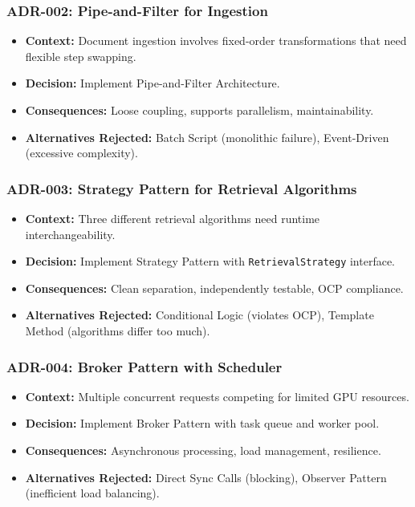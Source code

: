 \documentclass[11pt,a4paper]{article}
\begin{document}
\subsubsection{ADR-002: Pipe-and-Filter for Ingestion}
\begin{itemize}[leftmargin=*]
    \item \textbf{Context:} Document ingestion involves fixed-order transformations that need flexible step swapping.
    \item \textbf{Decision:} Implement Pipe-and-Filter Architecture.
    \item \textbf{Consequences:} Loose coupling, supports parallelism, maintainability.
    \item \textbf{Alternatives Rejected:} Batch Script (monolithic failure), Event-Driven (excessive complexity).
\end{itemize}

\subsubsection{ADR-003: Strategy Pattern for Retrieval Algorithms}
\begin{itemize}[leftmargin=*]
    \item \textbf{Context:} Three different retrieval algorithms need runtime interchangeability.
    \item \textbf{Decision:} Implement Strategy Pattern with \texttt{RetrievalStrategy} interface.
    \item \textbf{Consequences:} Clean separation, independently testable, OCP compliance.
    \item \textbf{Alternatives Rejected:} Conditional Logic (violates OCP), Template Method (algorithms differ too much).
\end{itemize}

\subsubsection{ADR-004: Broker Pattern with Scheduler}
\begin{itemize}[leftmargin=*]
    \item \textbf{Context:} Multiple concurrent requests competing for limited GPU resources.
    \item \textbf{Decision:} Implement Broker Pattern with task queue and worker pool.
    \item \textbf{Consequences:} Asynchronous processing, load management, resilience.
    \item \textbf{Alternatives Rejected:} Direct Sync Calls (blocking), Observer Pattern (inefficient load balancing).
\end{itemize}
\end{document}
